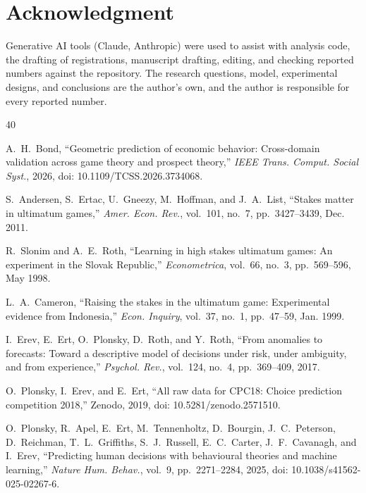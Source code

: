 \documentclass[journal]{IEEEtran}
\begin{document}
\section*{Acknowledgment}
Generative AI tools (Claude, Anthropic) were used to assist with analysis code, the drafting of registrations, manuscript drafting, editing, and checking reported numbers against the repository.
The research questions, model, experimental designs, and conclusions are the author's own, and the author is responsible for every reported number.

\begin{thebibliography}{40}

A.~H.~Bond, ``Geometric prediction of economic behavior: Cross-domain validation across game theory and prospect theory,''
\emph{IEEE Trans. Comput. Social Syst.}, 2026, doi: 10.1109/TCSS.2026.3734068. %

S.~Andersen, S.~Ertac, U.~Gneezy, M.~Hoffman, and J.~A.~List, ``Stakes matter in ultimatum games,''
\emph{Amer. Econ. Rev.}, vol.~101, no.~7, pp.~3427--3439, Dec. 2011. %

R.~Slonim and A.~E.~Roth, ``Learning in high stakes ultimatum games: An experiment in the Slovak Republic,''
\emph{Econometrica}, vol.~66, no.~3, pp.~569--596, May 1998. %

L.~A.~Cameron, ``Raising the stakes in the ultimatum game: Experimental evidence from Indonesia,''
\emph{Econ. Inquiry}, vol.~37, no.~1, pp.~47--59, Jan. 1999. %

I.~Erev, E.~Ert, O.~Plonsky, D.~Roth, and Y.~Roth, ``From anomalies to forecasts: Toward a descriptive model of decisions under risk, under ambiguity, and from experience,''
\emph{Psychol. Rev.}, vol.~124, no.~4, pp.~369--409, 2017.

O.~Plonsky, I.~Erev, and E.~Ert, ``All raw data for CPC18: Choice prediction competition 2018,''
Zenodo, 2019, doi: 10.5281/zenodo.2571510.

O.~Plonsky, R.~Apel, E.~Ert, M.~Tennenholtz, D.~Bourgin, J.~C.~Peterson, D.~Reichman,
T.~L.~Griffiths, S.~J.~Russell, E.~C.~Carter, J.~F.~Cavanagh, and I.~Erev, ``Predicting human
decisions with behavioural theories and machine learning,'' \emph{Nature Hum. Behav.},
vol.~9, pp.~2271--2284, 2025, doi: 10.1038/s41562-025-02267-6.


\end{thebibliography}
\end{document}
